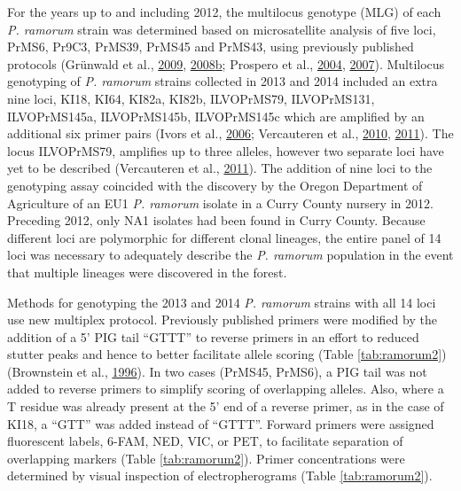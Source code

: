 \documentclass[double,12pt]{beavtex}
\begin{document}
  For the years up to and including 2012, the multilocus genotype (MLG) of
  each \emph{P. ramorum} strain was determined based on microsatellite
  analysis of five loci, PrMS6, Pr9C3, PrMS39, PrMS45 and PrMS43, using
  previously published protocols (Grünwald et al.,
  \protect\hyperlink{ref-grunwald2009standardizing}{2009},
  \protect\hyperlink{ref-grunwald2008susceptibility}{2008}\protect\hyperlink{ref-grunwald2008susceptibility}{b};
  Prospero et al., \protect\hyperlink{ref-prospero2004isolation}{2004},
  \protect\hyperlink{ref-prospero2007population}{2007}). Multilocus
  genotyping of \emph{P. ramorum} strains collected in 2013 and 2014
  included an extra nine loci, KI18, KI64, KI82a, KI82b, ILVOPrMS79,
  ILVOPrMS131, ILVOPrMS145a, ILVOPrMS145b, ILVOPrMS145c which are
  amplified by an additional six primer pairs (Ivors et al.,
  \protect\hyperlink{ref-ivors2006microsatellite}{2006}; Vercauteren et
  al., \protect\hyperlink{ref-vercauteren2010clonal}{2010},
  \protect\hyperlink{ref-vercauteren2011identification}{2011}). The locus
  ILVOPrMS79, amplifies up to three alleles, however two separate loci
  have yet to be described (Vercauteren et al.,
  \protect\hyperlink{ref-vercauteren2011identification}{2011}). The
  addition of nine loci to the genotyping assay coincided with the
  discovery by the Oregon Department of Agriculture of an EU1 \emph{P.
  ramorum} isolate in a Curry County nursery in 2012. Preceding 2012, only
  NA1 isolates had been found in Curry County. Because different loci are
  polymorphic for different clonal lineages, the entire panel of 14 loci
  was necessary to adequately describe the \emph{P. ramorum} population in
  the event that multiple lineages were discovered in the forest.
  
  Methods for genotyping the 2013 and 2014 \emph{P. ramorum} strains with
  all 14 loci use new multiplex protocol. Previously published primers
  were modified by the addition of a 5' PIG tail ``GTTT'' to reverse
  primers in an effort to reduced stutter peaks and hence to better
  facilitate allele scoring (Table \ref{tab:ramorum2}) (Brownstein et al.,
  \protect\hyperlink{ref-brownstein1996modulation}{1996}). In two cases
  (PrMS45, PrMS6), a PIG tail was not added to reverse primers to simplify
  scoring of overlapping alleles. Also, where a T residue was already
  present at the 5' end of a reverse primer, as in the case of KI18, a
  ``GTT'' was added instead of ``GTTT''. Forward primers were assigned
  fluorescent labels, 6-FAM, NED, VIC, or PET, to facilitate separation of
  overlapping markers (Table \ref{tab:ramorum2}). Primer concentrations
  were determined by visual inspection of electropherograms (Table
  \ref{tab:ramorum2}).
  
\end{document}
